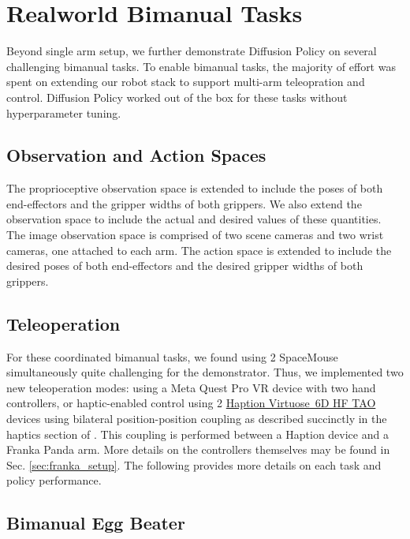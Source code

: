 \section{Realworld Bimanual Tasks}
\label{sec:eval_bimanual}
Beyond single arm setup, we further demonstrate Diffusion Policy on several challenging bimanual tasks. To enable bimanual tasks, the majority of effort was spent on extending our robot stack to support multi-arm teleopration and control. Diffusion Policy worked out of the box for these tasks without hyperparameter tuning.

\subsection{Observation and Action Spaces}
The proprioceptive observation space is extended to include the poses of both end-effectors and the gripper widths of both grippers. We also extend the observation space to include the actual and desired values of these quantities.
The image observation space is comprised of two scene cameras and two wrist cameras, one attached to each arm.
The action space is extended to include the desired poses of both end-effectors and the desired gripper widths of both grippers.

\subsection{Teleoperation}
For these coordinated bimanual tasks, we found using 2 SpaceMouse simultaneously quite challenging for the demonstrator. Thus, we implemented two new teleoperation modes:
using a Meta Quest Pro VR device with two hand controllers, or
haptic-enabled control using 2
\href{https://www.haption.com/en/products-en/virtuose-6d-tao-en.html\#fa-download-downloads}{
Haption Virtuose\legalTM\ 6D HF TAO}
devices using bilateral position-position coupling as described succinctly in the haptics section of \citet{siciliano2008springer}. This coupling is performed between a Haption device and a Franka Panda arm.
More details on the controllers themselves may be found in Sec. \ref{sec:franka_setup}.
The following provides more details on each task and policy performance.

\subsection{Bimanual Egg Beater}

